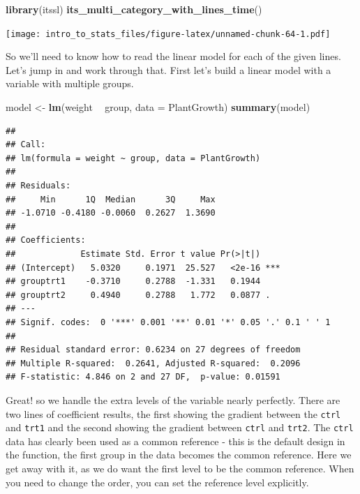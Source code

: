 \documentclass[
]{book}
\newenvironment{Shaded}{\begin{snugshade}}{\end{snugshade}}
\newcommand{\DataTypeTok}[1]{\textcolor[rgb]{0.13,0.29,0.53}{#1}}
\newcommand{\KeywordTok}[1]{\textcolor[rgb]{0.13,0.29,0.53}{\textbf{#1}}}
\newcommand{\NormalTok}[1]{#1}
\newcommand{\OperatorTok}[1]{\textcolor[rgb]{0.81,0.36,0.00}{\textbf{#1}}}
\newcommand{\StringTok}[1]{\textcolor[rgb]{0.31,0.60,0.02}{#1}}
\begin{document}
\begin{Shaded}
\begin{Highlighting}[]
\KeywordTok{library}\NormalTok{(itssl)}
\KeywordTok{its_multi_category_with_lines_time}\NormalTok{()}
\end{Highlighting}
\end{Shaded}

\texttt{[image: intro\_to\_stats\_files/figure-latex/unnamed-chunk-64-1.pdf]}

So we'll need to know how to read the linear model for each of the given lines.
Let's jump in and work through that. First let's build a linear model with a variable with multiple groups.

\begin{Shaded}
\begin{Highlighting}[]
\NormalTok{model <-}\StringTok{ }\KeywordTok{lm}\NormalTok{(weight }\OperatorTok{~}\StringTok{ }\NormalTok{group, }\DataTypeTok{data =}\NormalTok{ PlantGrowth)}
\KeywordTok{summary}\NormalTok{(model)}
\end{Highlighting}
\end{Shaded}

\begin{verbatim}
## 
## Call:
## lm(formula = weight ~ group, data = PlantGrowth)
## 
## Residuals:
##     Min      1Q  Median      3Q     Max 
## -1.0710 -0.4180 -0.0060  0.2627  1.3690 
## 
## Coefficients:
##             Estimate Std. Error t value Pr(>|t|)    
## (Intercept)   5.0320     0.1971  25.527   <2e-16 ***
## grouptrt1    -0.3710     0.2788  -1.331   0.1944    
## grouptrt2     0.4940     0.2788   1.772   0.0877 .  
## ---
## Signif. codes:  0 '***' 0.001 '**' 0.01 '*' 0.05 '.' 0.1 ' ' 1
## 
## Residual standard error: 0.6234 on 27 degrees of freedom
## Multiple R-squared:  0.2641,	Adjusted R-squared:  0.2096 
## F-statistic: 4.846 on 2 and 27 DF,  p-value: 0.01591
\end{verbatim}

Great! so we handle the extra levels of the variable nearly perfectly. There are two lines of coefficient results, the first showing the gradient between the \texttt{ctrl} and \texttt{trt1} and the second showing the gradient between \texttt{ctrl} and \texttt{trt2}. The \texttt{ctrl} data has clearly been used as a common reference - this is the default design in the function, the first group in the data becomes the common reference. Here we get away with it, as we do want the first level to be the common reference. When you need to change the order, you can set the reference level explicitly.
\end{document}
